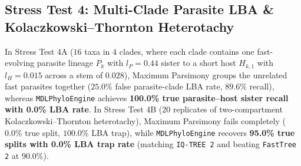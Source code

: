 \documentclass[11pt,a4paper]{article}
\begin{document}
\begin{table}[H]
\centering
\caption{Stress Test 3 --- Zero-Bootstrap \texttt{MDLPhyloEngine} vs.\ Support-Collapsed ML \& Bayesian Trees (8 Polytomy Replicates + 6 Convergent Hijack Replicates).}
\label{tab:stress3}
\end{table}

\subsection{Stress Test 4: Multi-Clade Parasite LBA \& Kolaczkowski--Thornton Heterotachy}

In Stress Test 4A ($16$ taxa in $4$ clades, where each clade contains one fast-evolving parasite lineage $P_k$ with $l_P = 0.44$ sister to a short host $H_{k,1}$ with $l_{H} = 0.015$ across a stem of $0.028$), Maximum Parsimony groups the unrelated fast parasites together ($25.0\%$ false parasite-clade LBA rate, $89.6\%$ recall), whereas \texttt{MDLPhyloEngine} achieves \textbf{100.0\% true parasite--host sister recall with 0.0\% LBA rate}. In Stress Test 4B ($20$ replicates of two-compartment Kolaczkowski--Thornton heterotachy), Maximum Parsimony fails completely ($0.0\%$ true split, $100.0\%$ LBA trap), while \texttt{MDLPhyloEngine} recovers \textbf{95.0\% true splits with 0.0\% LBA trap rate} (matching \texttt{IQ-TREE 2} and beating \texttt{FastTree 2} at $90.0\%$).
\end{document}
